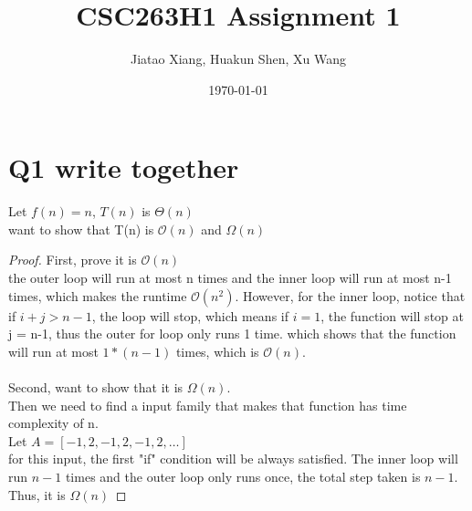 \documentclass[10pt]{article}
\title{CSC263H1 Assignment 1}
\author{Jiatao Xiang,  Huakun Shen,  Xu Wang}
\date{\today}
\begin{document}
\maketitle
\section*{Q1 write together}
Let $f(n) = n$, $T(n)$ is $\Theta(n)$ \\
want to show that T(n) is $\mathcal{O}(n)$ and $\Omega(n)$
\begin{proof}
First, prove it is $\mathcal{O}(n)$\\
the outer loop will run at most n times and the inner loop will run at most n-1 times, which makes the runtime $\mathcal{O}(n^2)$. However, 
for the inner loop, notice that if $i+j>n-1$, the loop will stop, which means if $i=1$, the function will stop at j = n-1, thus the outer for loop only runs 1 time. which shows that the function will run at most $1*(n-1)$ times, which is $\mathcal{O}(n)$.\\
\\
Second, want to show that it is $\Omega(n)$.\\
Then we need to find a input family that makes that function has time complexity of n.\\
Let $A = [-1 , 2,-1,2,-1,2, \dots]$\\
for this input, the first "if" condition will be always satisfied. The inner loop will run $n-1$ times and the outer loop only runs once, the total step taken is $n-1$. Thus, it is $\Omega(n)$
\end{proof}
\end{document}
